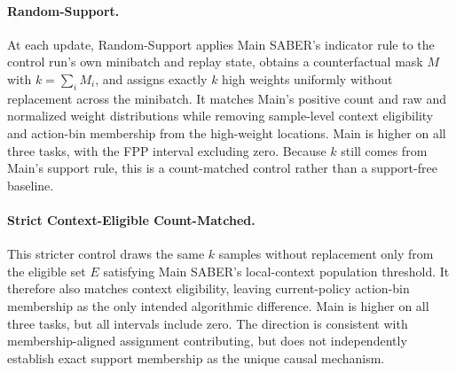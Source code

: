 \documentclass[letterpaper]{article}
\begin{document}
\paragraph{Random-Support.}
At each update, Random-Support applies Main SABER's indicator rule to the control run's own minibatch and replay state, obtains a counterfactual mask \(M\) with \(k=\sum_i M_i\), and assigns exactly \(k\) high weights uniformly without replacement across the minibatch. It matches Main's positive count and raw and normalized weight distributions while removing sample-level context eligibility and action-bin membership from the high-weight locations. Main is higher on all three tasks, with the FPP interval excluding zero. Because \(k\) still comes from Main's support rule, this is a count-matched control rather than a support-free baseline.

\paragraph{Strict Context-Eligible Count-Matched.}
This stricter control draws the same \(k\) samples without replacement only from the eligible set \(E\) satisfying Main SABER's local-context population threshold. It therefore also matches context eligibility, leaving current-policy action-bin membership as the only intended algorithmic difference. Main is higher on all three tasks, but all intervals include zero. The direction is consistent with membership-aligned assignment contributing, but does not independently establish exact support membership as the unique causal mechanism.
\end{document}
